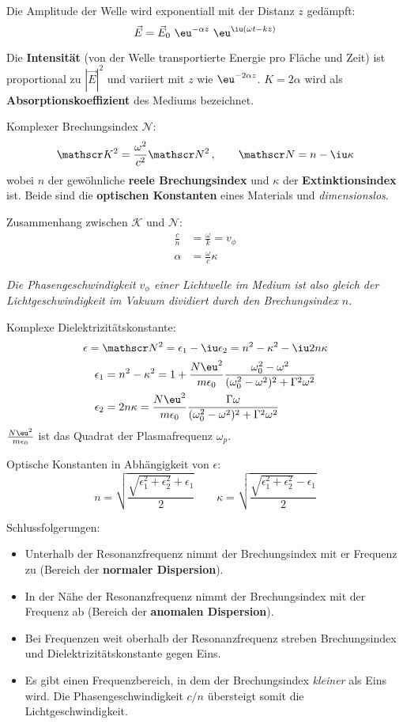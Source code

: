 		Die Amplitude der Welle wird exponentiall mit der Distanz $z$ gedämpft:
		\[
			\vec E = \vec E_0 \ \eu^{-\alpha z} \ \eu^{\iu(\omega t - kz)}
		\]
		
		Die \textbf{Intensität} (von der Welle transportierte Energie pro Fläche und Zeit) ist proportional zu $|\vec E|^2$ und variiert mit $z$ wie $\eu^{-2\alpha z}$. $K = 2\alpha$ wird als \textbf{Absorptionskoeffizient} des Mediums bezeichnet.
		
		Komplexer Brechungsindex $\mathscr N$:
		\[
			\mathscr K^2 = \frac{\omega^2}{c^2} \mathscr N^2 \,,\qquad \mathscr N = n - \iu \kappa
		\]
		wobei $n$ der gewöhnliche \textbf{reele Brechungsindex} und $\kappa$ der \textbf{Extinktionsindex} ist. Beide sind die \textbf{optischen Konstanten} eines Materials und \emph{dimensionslos}.
		
		Zusammenhang zwischen $\mathscr K$ und $\mathscr N$:
		\begin{align*}
			\frac c n &= \frac \omega k = v_\phi \\
			\alpha &= \frac \omega c \kappa
		\end{align*}
		
		\emph{Die Phasengeschwindigkeit $v_\phi$ einer Lichtwelle im Medium ist also gleich der Lichtgeschwindigkeit im Vakuum dividiert durch den Brechungsindex $n$.}
		
		Komplexe Dielektrizitätskonstante:
		\[
			\epsilon = \mathscr N^2 = \epsilon_1 - \iu \epsilon_2 = n^2 - \kappa^2 - \iu 2 n\kappa
		\]
		\begin{align*}
			\epsilon_1 &= n^2 - \kappa^2 = 1 + \frac{N \eu^2}{m\epsilon_0} \frac{\omega_0^2 - \omega^2}{(\omega_0^2 - \omega^2)^2 + \Gamma^2 \omega^2} \\
			\epsilon_2 &= 2n\kappa = \frac{N \eu^2}{m\epsilon_0} \frac{\Gamma \omega}{(\omega_0^2 - \omega^2)^2 + \Gamma^2 \omega^2}
		\end{align*}
		$\frac{N \eu^2}{m\epsilon_0}$ ist das Quadrat der Plasmafrequenz $\omega_p$.
		
		Optische Konstanten in Abhängigkeit von $\epsilon$:
		\begin{equation*}
			n = \sqrt{\frac{\sqrt{\epsilon_1^2 + \epsilon_2^2}+\epsilon_1}{2}} \qquad
			\kappa = \sqrt{\frac{\sqrt{\epsilon_1^2 + \epsilon_2^2}-\epsilon_1}{2}}
		\end{equation*}
		
		Schlussfolgerungen:
		\begin{itemize}
			\item Unterhalb der Resonanzfrequenz nimmt der Brechungsindex mit er Frequenz zu (Bereich der \textbf{normaler Dispersion}).
			\item In der Nähe der Resonanzfrequenz nimmt der Brechungsindex mit der Frequenz ab (Bereich der \textbf{anomalen Dispersion}).
			\item Bei Frequenzen weit oberhalb der Resonanzfrequenz streben Brechungsindex und Dielektrizitätskonstante gegen Eins.
			\item Es gibt einen Frequenzbereich, in dem der Brechungsindex \emph{kleiner} als Eins wird. Die Phasengeschwindigkeit $c/n$ übersteigt somit die Lichtgeschwindigkeit.
		\end{itemize}
		
